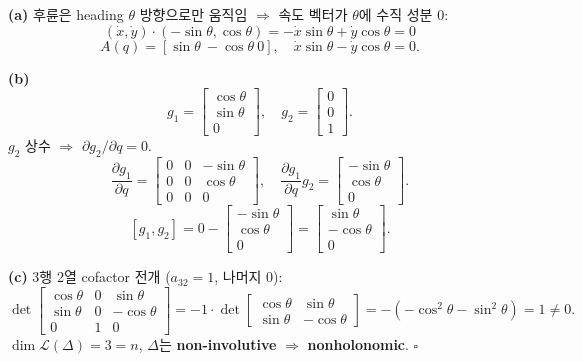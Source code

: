 \documentclass[11pt,a4paper]{article}
\begin{document}
\begin{sol}
\textbf{(a)} 후륜은 heading $\theta$ 방향으로만 움직임 $\Rightarrow$ 속도 벡터가 $\theta$에 수직 성분 0:
\[
(\dot x, \dot y) \cdot (-\sin\theta, \cos\theta) = -\dot x\sin\theta + \dot y\cos\theta = 0
\]
\[
\boxed{A(q) = [\sin\theta\ -\cos\theta\ 0],\quad \dot x\sin\theta - \dot y\cos\theta = 0.}
\]

\textbf{(b)}
\[
g_1 = \begin{bmatrix}\cos\theta\\\sin\theta\\0\end{bmatrix},\quad g_2 = \begin{bmatrix}0\\0\\1\end{bmatrix}.
\]
$g_2$ 상수 $\Rightarrow$ $\partial g_2/\partial q = 0$.
\[
\frac{\partial g_1}{\partial q} = \begin{bmatrix}0 & 0 & -\sin\theta\\0 & 0 & \cos\theta\\0 & 0 & 0\end{bmatrix},\quad \frac{\partial g_1}{\partial q}g_2 = \begin{bmatrix}-\sin\theta\\\cos\theta\\0\end{bmatrix}.
\]
\[
\boxed{[g_1, g_2] = 0 - \begin{bmatrix}-\sin\theta\\\cos\theta\\0\end{bmatrix} = \begin{bmatrix}\sin\theta\\-\cos\theta\\0\end{bmatrix}.}
\]

\textbf{(c)} 3행 2열 cofactor 전개 ($a_{32} = 1$, 나머지 0):
\[
\det\begin{bmatrix}\cos\theta & 0 & \sin\theta\\\sin\theta & 0 & -\cos\theta\\0 & 1 & 0\end{bmatrix} = -1 \cdot \det\begin{bmatrix}\cos\theta & \sin\theta\\\sin\theta & -\cos\theta\end{bmatrix} = -(-\cos^2\theta - \sin^2\theta) = 1 \neq 0.
\]
$\dim \mathcal{L}(\Delta) = 3 = n$, $\Delta$는 \textbf{non-involutive} $\Rightarrow$ \textbf{nonholonomic}. \hfill$\square$
\end{sol}
\end{document}
